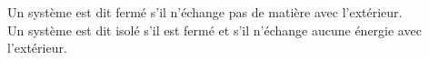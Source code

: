 \documentclass[a4paper]{article}
\begin{document}
\pagestyle{fancy}
\fancyhf{}
\setlength{\headheight}{15pt}

\begin{center}
	\large{}
\end{center}


Un système est dit fermé s'il n'échange pas de matière avec l'extérieur.\\
Un système est dit isolé s'il est fermé et s'il n'échange aucune énergie avec l'extérieur.
\end{document}
